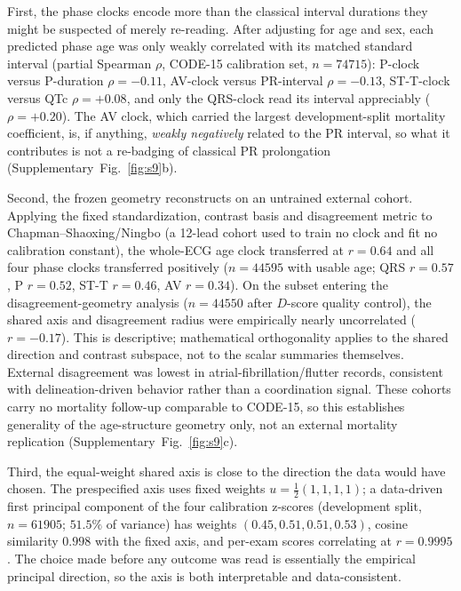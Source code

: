 \documentclass[11pt]{article}
\newcommand{\D}{\ensuremath{D}}
\begin{document}
First, the phase clocks encode more than the classical interval durations they might be
suspected of merely re-reading. After adjusting for age and sex, each predicted phase age
was only weakly correlated with its matched standard interval (partial Spearman $\rho$,
CODE-15 calibration set, $n=\num{74715}$): P-clock versus P-duration $\rho=-\num{0.11}$,
AV-clock versus PR-interval $\rho=-\num{0.13}$, ST-T-clock versus QTc $\rho=+\num{0.08}$,
and only the QRS-clock read its interval appreciably ($\rho=+\num{0.20}$). The AV clock, which
carried the largest development-split mortality coefficient, is, if anything, \emph{weakly negatively} related to the PR
interval, so what it contributes is not a re-badging of classical PR prolongation
(Supplementary~Fig.~\ref{fig:s9}b).

Second, the frozen geometry reconstructs on an untrained external cohort. Applying the
fixed standardization, contrast basis and disagreement metric to Chapman--Shaoxing/Ningbo
(a 12-lead cohort used to train no clock and fit no calibration constant), the whole-ECG
age clock transferred at $r=\num{0.64}$ and all four phase clocks transferred positively
($n=\num{44595}$ with usable age; QRS $r=\num{0.57}$, P $r=\num{0.52}$, ST-T $r=\num{0.46}$,
AV $r=\num{0.34}$). On the subset entering the disagreement-geometry analysis
($n=\num{44550}$ after \D-score quality control), the shared axis and disagreement radius
were empirically nearly uncorrelated ($r=-\num{0.17}$). This is descriptive;
mathematical orthogonality applies to the shared direction and contrast
subspace, not to the scalar summaries themselves. External disagreement was lowest in atrial-fibrillation/flutter records,
consistent with delineation-driven behavior rather than a coordination signal. These
cohorts carry no mortality follow-up comparable to CODE-15, so this establishes generality
of the age-structure geometry only, not an external mortality replication
(Supplementary~Fig.~\ref{fig:s9}c).

Third, the equal-weight shared axis is close to the direction the data would have chosen.
The prespecified axis uses fixed weights $u=\tfrac12(1,1,1,1)$; a data-driven first
principal component of the four calibration z-scores (development split, $n=\num{61905}$;
$\num{51.5}\%$ of variance) has weights $(\num{0.45},\num{0.51},\num{0.51},\num{0.53})$, cosine
similarity $\num{0.998}$ with the fixed axis, and per-exam scores correlating at
$r=\num{0.9995}$. The choice made before any outcome was read is essentially the empirical
principal direction, so the axis is both interpretable and data-consistent.
\end{document}
